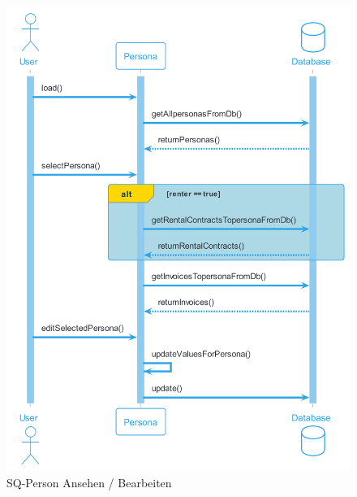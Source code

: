 \begin{figure}[H]
  \begin{center}
    \includegraphics[width=0.75\linewidth]{content/diagrams/out/sequenzdiagram/personAnsehen/personAnsehen.png}
    \caption{SQ-Person Ansehen / Bearbeiten}
    \label{sqMieter}
  \end{center}
\end{figure}

